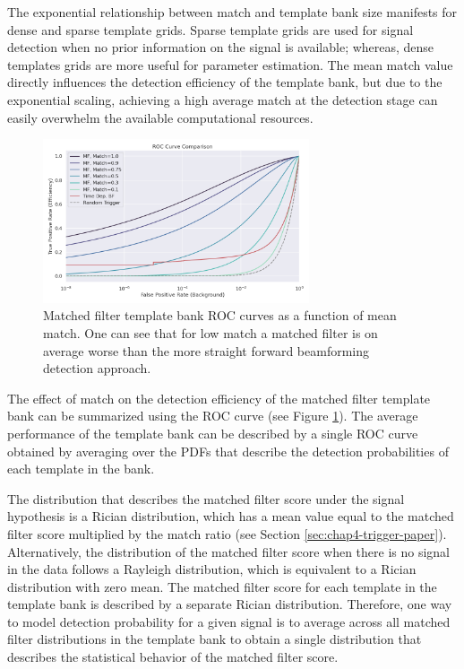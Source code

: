 The exponential relationship between match and template bank size manifests for dense and sparse template grids. Sparse template grids are used for signal detection when no prior information on the signal is available; whereas, dense templates grids are more useful for parameter estimation. The mean match value directly influences the detection efficiency of the template bank, but due to the exponential scaling, achieving a high average match at the detection stage can easily overwhelm the available computational resources.

\begin{figure}[htbp]
    \centering
    \includegraphics*[width=0.7\textwidth]{figs/Chapter-4/220223_mf_roc_curve_comparison_with_bf.png}
    \caption{\label{fig:chap4-mf-roc-curve-match-analysis} Matched filter template bank ROC curves as a function of mean match. One can see that for low match a matched filter is on average worse than the more straight forward beamforming detection approach. }
\end{figure}

The effect of match on the detection efficiency of the matched filter template bank can be summarized using the ROC curve (see Figure \ref{fig:chap4-mf-roc-curve-match-analysis}). The average performance of the template bank can be described by a single ROC curve obtained by averaging over the PDFs that describe the detection probabilities of each template in the bank. 

The distribution that describes the matched filter score under the signal hypothesis is a Rician distribution, which has a mean value equal to the matched filter score multiplied by the match ratio (see Section \ref{sec:chap4-trigger-paper}). Alternatively, the distribution of the matched filter score when there is no signal in the data follows a Rayleigh distribution, which is equivalent to a Rician distribution with zero mean. The matched filter score for each template in the template bank is described by a separate Rician distribution. Therefore, one way to model detection probability for a given signal is to average across all matched filter distributions in the template bank to obtain a single distribution that describes the statistical behavior of the matched filter score.

